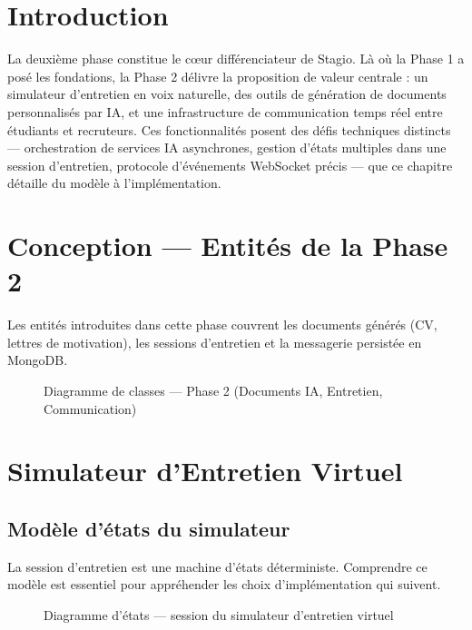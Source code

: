 ﻿\documentclass[12pt,a4paper]{report}
\begin{document}
\section*{Introduction}
La deuxième phase constitue le cœur différenciateur de Stagio. Là où la Phase 1 a posé les fondations, la Phase 2 délivre la proposition de valeur centrale : un simulateur d'entretien en voix naturelle, des outils de génération de documents personnalisés par IA, et une infrastructure de communication temps réel entre étudiants et recruteurs. Ces fonctionnalités posent des défis techniques distincts — orchestration de services IA asynchrones, gestion d'états multiples dans une session d'entretien, protocole d'événements WebSocket précis — que ce chapitre détaille du modèle à l'implémentation.

\section{Conception — Entités de la Phase 2}

Les entités introduites dans cette phase couvrent les documents générés (CV, lettres de motivation), les sessions d'entretien et la messagerie persistée en MongoDB.

\begin{figure}[H]
\centering
\resizebox{\textwidth}{!}{}
\caption{Diagramme de classes — Phase 2 (Documents IA, Entretien, Communication)}
\label{fig:class_r2}
\end{figure}

\section{Simulateur d'Entretien Virtuel}

\subsection{Modèle d'états du simulateur}

La session d'entretien est une machine d'états déterministe. Comprendre ce modèle est essentiel pour appréhender les choix d'implémentation qui suivent.

\begin{figure}[H]
\centering
\resizebox{0.72\textwidth}{!}{}
\caption{Diagramme d'états — session du simulateur d'entretien virtuel}
\label{fig:state_interview}
\end{figure}
\end{document}
